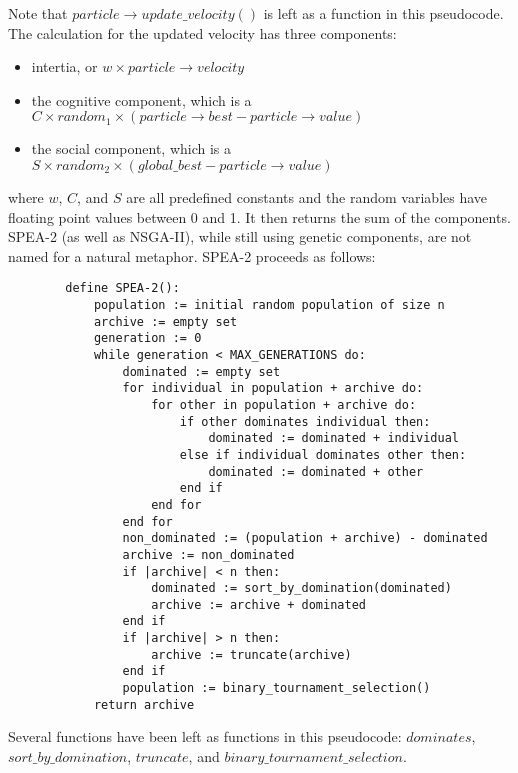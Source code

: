 \documentclass{article}
\begin{document}
    Note that \(particle \rightarrow update\_velocity()\) is left as a function in this pseudocode. The calculation for the updated velocity has three components:
    \begin{itemize}
        \item intertia, or \(w \times particle \rightarrow velocity\)
        \item the cognitive component, which is a \(C \times random_1 \times (particle \rightarrow best - particle \rightarrow value)\)
        \item the social component, which is a \(S \times random_2 \times (global\_best - particle \rightarrow value)\)
    \end{itemize}
    where \(w\), \(C\), and \(S\) are all predefined constants and the random variables have floating point values between 0 and 1. It then returns the sum of 
    the components. \cite{EberhartKennedy} \cite{KhanesarTavakoliTeshnehlabShoorehdeli} \\
    SPEA-2 (as well as NSGA-II), while still using genetic components, are not named for a natural metaphor. SPEA-2 proceeds as follows:
    \begin{lstlisting}
        define SPEA-2():
            population := initial random population of size n
            archive := empty set
            generation := 0
            while generation < MAX_GENERATIONS do:
                dominated := empty set
                for individual in population + archive do:
                    for other in population + archive do:
                        if other dominates individual then:
                            dominated := dominated + individual
                        else if individual dominates other then:
                            dominated := dominated + other
                        end if
                    end for
                end for
                non_dominated := (population + archive) - dominated
                archive := non_dominated
                if |archive| < n then:
                    dominated := sort_by_domination(dominated)
                    archive := archive + dominated
                end if
                if |archive| > n then:
                    archive := truncate(archive)
                end if
                population := binary_tournament_selection()
            return archive
    \end{lstlisting}
    Several functions have been left as functions in this pseudocode: \(dominates\), \(sort\_by\_domination\), \(truncate\), and \(binary\_tournament\_selection\). 
\end{document}
